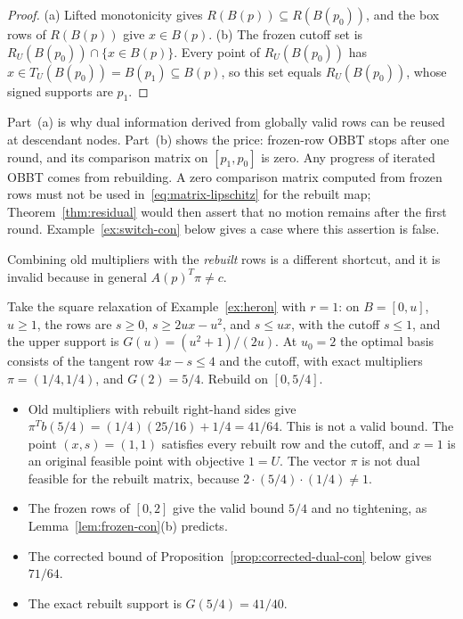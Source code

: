 \begin{proof}
(a) Lifted monotonicity gives $R(B(p))\subseteq R(B(p_0))$, and the box
rows of $R(B(p))$ give $x\in B(p)$. (b) The frozen cutoff set is
$R_U(B(p_0))\cap\{x\in B(p)\}$. Every point of $R_U(B(p_0))$ has
$x\in T_U(B(p_0))=B(p_1)\subseteq B(p)$, so this set equals
$R_U(B(p_0))$, whose signed supports are $p_1$.
\end{proof}

Part~(a) is why dual information derived from globally valid rows can be
reused at descendant nodes. Part~(b) shows the price: frozen-row OBBT stops
after one round, and its comparison matrix on $[p_1,p_0]$ is zero. Any
progress of iterated OBBT comes from rebuilding. A zero comparison matrix
computed from frozen rows must not be used in~\eqref{eq:matrix-lipschitz}
for the rebuilt map; Theorem~\ref{thm:residual} would then assert that
no motion remains after the first round. Example~\ref{ex:switch-con} below
gives a case where this assertion is false.

Combining old multipliers with the \emph{rebuilt} rows is a different
shortcut, and it is invalid because in general $A(p)^T\pi\ne c$.

\begin{example}\label{ex:rebuilt-dual-con}
Take the square relaxation of Example~\ref{ex:heron} with $r=1$: on
$B=[0,u]$, $u\ge1$, the rows are $s\ge0$, $s\ge2ux-u^2$, and $s\le ux$,
with the cutoff $s\le1$, and the upper support is
$G(u)=(u^2+1)/(2u)$. At $u_0=2$ the optimal basis consists of the tangent
row $4x-s\le4$ and the cutoff, with exact multipliers $\pi=(1/4,1/4)$,
and $G(2)=5/4$. Rebuild on $[0,5/4]$.
\begin{itemize}
\item Old multipliers with rebuilt right-hand sides give
 $\pi^Tb(5/4)=(1/4)(25/16)+1/4=41/64$. This is not a valid bound. The
 point $(x,s)=(1,1)$ satisfies every rebuilt row and the cutoff, and $x=1$
 is an original feasible point with objective $1=U$. The vector $\pi$ is
 not dual feasible for the rebuilt matrix, because
 $2\cdot(5/4)\cdot(1/4)\ne1$.
\item The frozen rows of $[0,2]$ give the valid bound $5/4$ and no
 tightening, as Lemma~\ref{lem:frozen-con}(b) predicts.
\item The corrected bound of Proposition~\ref{prop:corrected-dual-con}
 below gives $71/64$.
\item The exact rebuilt support is $G(5/4)=41/40$.
\end{itemize}
\end{example}

